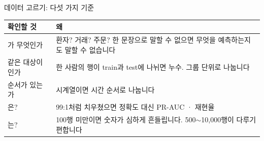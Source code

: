 \documentclass[aspectratio=169,11pt,t]{beamer}
\begin{document}
\begin{frame}{데이터 고르기: 다섯 가지 기준}
\vfill
\centering
\renewcommand{\arraystretch}{1.45}
\begin{tabular}{L{4.4cm}L{8.6cm}}
\toprule
\textbf{확인할 것} & \textbf{왜} \\
\midrule
{}가 무엇인가 & 환자? 거래? 주문? 한 문장으로 말할 수 없으면 무엇을 예측하는지도 말할 수 없습니다 \\
같은 대상이 인가 & 한 사람의 행이 train과 test에 나뉘면 누수. 그룹 단위로 나눕니다 \\
 순서가 있는가 & 시계열이면 시간 순서로 나눕니다 \\
은? & 99:1처럼 치우쳤으면 정확도 대신 PR-AUC · 재현율 \\
는? & 100행 미만이면 숫자가 심하게 흔들립니다. 500$\sim$10,000행이 다루기 편합니다 \\
\bottomrule
\end{tabular}
\vfill
{}
\end{frame}
\end{document}
